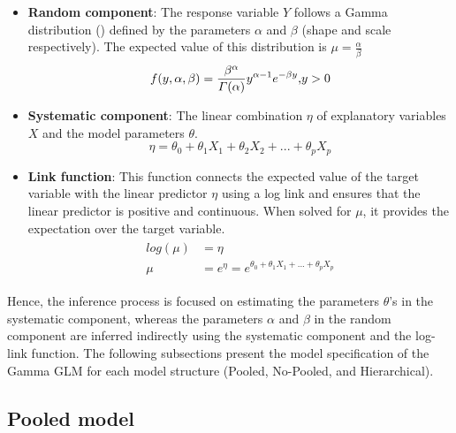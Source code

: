 \begin{itemize}
    \item \textbf{Random component}: The response variable $Y$ follows a Gamma distribution () defined by the parameters $\alpha$ and $\beta$ (shape and scale respectively). The expected value of this distribution is $\mu=\frac{\alpha}{\beta}$
    \begin{equation}\label{eq:gamma_distribution}
        f(y,\alpha, \beta)=\frac{\beta^\alpha}{\varGamma(\alpha)}y^{\alpha-1}e^{-\beta y} \text{ \\ \\ \\  , \\  \\ } y > 0
    \end{equation}
    \item \textbf{Systematic component}: The linear combination $\eta$ of explanatory variables $X$ and the model parameters $\theta$.
    \begin{equation}
        \eta = \theta_0 + \theta_1X_1+\theta_2X_2+...+\theta_pX_p
    \end{equation}
    \item \textbf{Link function}: This function connects the expected value of the target variable with the linear predictor $\eta$ using a log link and ensures that the linear predictor is positive and continuous. When solved for $\mu$, it provides the expectation over the target variable.
    \begin{align}
        \begin{split}
            log(\mu) &= \eta\\
            \mu &= e^{\eta}=e^{\theta_0+\theta_1X_1+...+\theta_pX_p}
        \end{split}
    \end{align}
\end{itemize}

Hence, the inference process is focused on estimating the parameters $\theta$'s in the systematic component, whereas the parameters $\alpha$ and $\beta$ in the random component are inferred indirectly using the systematic component and the log-link function. The following subsections present the model specification of the Gamma GLM for each model structure (Pooled, No-Pooled, and Hierarchical). 

\subsection{Pooled model}

